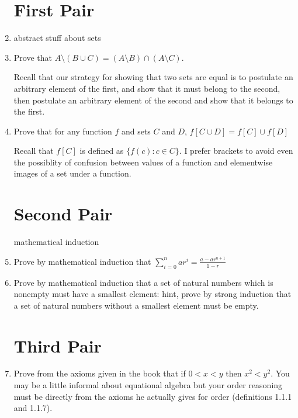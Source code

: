 \documentclass[12pt]{article}
\begin{document}
\begin{enumerate}

\section{First Pair}

\item[]   abstract stuff about sets

\item   Prove that $A \setminus (B \cup C) = (A \setminus B) \cap (A \setminus C)$.

Recall that our strategy for showing that two sets are equal is to postulate an arbitrary element of the first, and show that it must belong to the second, then postulate an arbitrary element of the second and show that it belongs to the first.

\newpage

\item   Prove that for any function $f$ and sets $C$ and $D$, $f[C \cup D] = f[C] \cup f[D]$

Recall that $f[C]$ is defined as $\{f(c):c \in C\}$.  I prefer brackets to avoid even the possiblity of confusion between values of a function and elementwise images of a set under a function.

\newpage

\section{Second Pair}

mathematical induction

\item   Prove by mathematical induction that $\sum_{i=0}^n ar^i = \frac{a - ar^{n+1}}{1-r}$

\newpage

\item  Prove by mathematical induction that a set of natural numbers which is nonempty must have a smallest element:  hint, prove by strong induction
that a set of natural numbers without a smallest element must be empty.

\newpage

\section{Third Pair}

\item  Prove from the axioms given in the book that if $0<x<y$ then $x^2<y^2$.  You may be a little informal about equational algebra but your order reasoning must be directly from the axioms he actually gives for order (definitions 1.1.1 and 1.1.7).


\end{enumerate}
\end{document}
